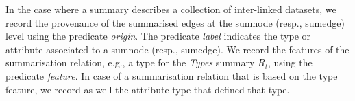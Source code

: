 In the case where a summary describes a collection of inter-linked datasets, we record the provenance of the summarised edges at the sumnode (resp., sumedge) level using the predicate \emph{origin}. The predicate \emph{label} indicates the type or attribute associated to a sumnode (resp., sumedge). We record the features of the summarisation relation, e.g., a type for the \emph{Types} summary $R_t$, using the predicate \emph{feature}. In case of a summarisation relation that is based on the type feature, we record as well the attribute type that defined that type.



